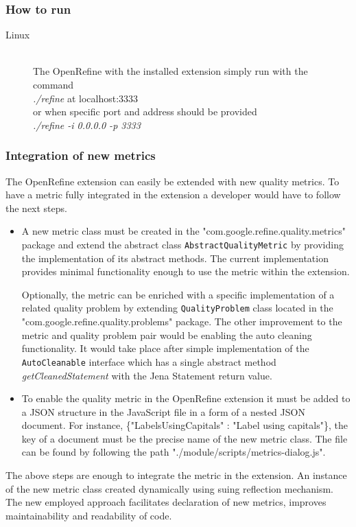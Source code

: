 \subsubsection{How to run}
\begin{description}
\item[Linux]\hfill \\
The OpenRefine with the installed extension simply run with the command\\
\textit{./refine} at localhost:3333\\
or when specific port and address should be provided\\
\textit{./refine -i 0.0.0.0 -p 3333}
\end{description}

\subsubsection{Integration of new metrics}
The OpenRefine extension can easily be extended with new quality metrics.
To have a metric fully integrated in the extension a developer would have to follow the next steps.

\begin{itemize}
	\item A new metric class must be created in the "com.google.refine.quality.metrics" package and extend the abstract class \texttt{AbstractQualityMetric} by providing the implementation of its abstract methods. The current implementation provides minimal functionality enough to use the metric within the extension. 
	
	Optionally, the metric can be enriched with a specific implementation	 of a related quality problem by extending \texttt{QualityProblem} class located in the "com.google.refine.quality.problems" package. The other improvement to the metric and quality problem pair would be enabling the auto cleaning functionality. It would take place after simple implementation of the \texttt{AutoCleanable} interface which has a single abstract method \textit{getCleanedStatement} with the Jena Statement return value.
	
	\item To enable the quality metric in the OpenRefine extension it must be added to a JSON structure in the JavaScript file in a form of a nested JSON document. For instance, \{"LabelsUsingCapitals" : "Label using capitals"\}, the key of a document must be the precise name of the new metric class. The file can be found by following the path "./module/scripts/metrics-dialog.js".
\end{itemize}

The above steps are enough to integrate the metric in the extension. An instance of the new metric class created dynamically using suing reflection mechanism. The new employed approach facilitates declaration of new metrics, improves maintainability and readability of code. 

